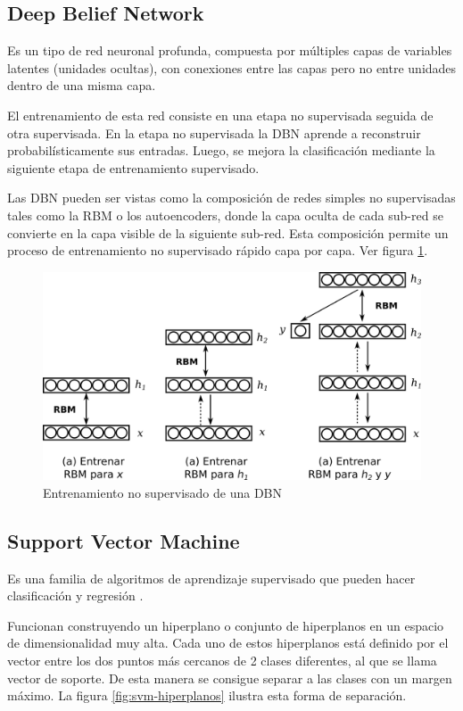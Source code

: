 \subsection{Deep Belief Network}

Es un tipo de red neuronal profunda, compuesta por múltiples capas de variables latentes (unidades ocultas), con conexiones entre las capas pero no entre unidades dentro de una misma capa.

El entrenamiento de esta red consiste en una etapa no supervisada seguida de otra supervisada. En la etapa no supervisada la \ac{DBN} aprende a reconstruir probabilísticamente sus entradas. Luego, se mejora la clasificación mediante la siguiente etapa de entrenamiento supervisado.

Las \ac{DBN} pueden ser vistas como la composición de redes simples no supervisadas tales como la \ac{RBM} o los autoencoders, donde la capa oculta de cada sub-red se convierte en la capa visible de la siguiente sub-red. Esta composición permite un proceso de entrenamiento no supervisado rápido capa por capa. Ver figura \ref{fig:dbn-train}.

\begin{figure}[htbp]
    \centering
    \includegraphics[width=0.9\linewidth]{graficos/propios/entrenamiento_dbn.png}
    \caption{Entrenamiento no supervisado de una DBN \citep{beysolow2017autoencoders}}
    \label{fig:dbn-train}
\end{figure}

\subsection{Support Vector Machine}

Es una familia de algoritmos de aprendizaje supervisado que pueden hacer clasificación y regresión \citep{cortes1995support}.

Funcionan construyendo un hiperplano o conjunto de hiperplanos en un espacio de dimensionalidad muy alta. Cada uno de estos hiperplanos está definido por el vector entre los dos puntos más cercanos de 2 clases diferentes, al que se llama vector de soporte. De esta manera se consigue separar a las clases con un margen máximo. La figura \ref{fig:svm-hiperplanos} ilustra esta forma de separación.

